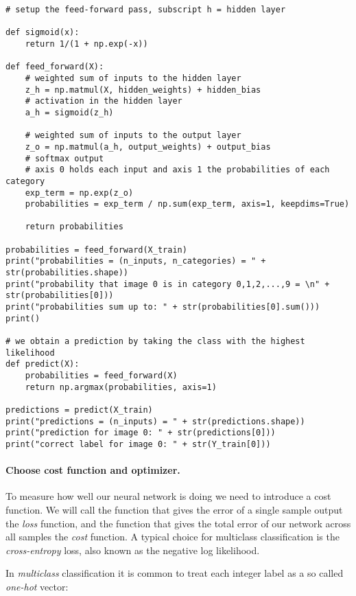 \begin{verbatim}
# setup the feed-forward pass, subscript h = hidden layer

def sigmoid(x):
    return 1/(1 + np.exp(-x))

def feed_forward(X):
    # weighted sum of inputs to the hidden layer
    z_h = np.matmul(X, hidden_weights) + hidden_bias
    # activation in the hidden layer
    a_h = sigmoid(z_h)
    
    # weighted sum of inputs to the output layer
    z_o = np.matmul(a_h, output_weights) + output_bias
    # softmax output
    # axis 0 holds each input and axis 1 the probabilities of each category
    exp_term = np.exp(z_o)
    probabilities = exp_term / np.sum(exp_term, axis=1, keepdims=True)
    
    return probabilities

probabilities = feed_forward(X_train)
print("probabilities = (n_inputs, n_categories) = " + str(probabilities.shape))
print("probability that image 0 is in category 0,1,2,...,9 = \n" + str(probabilities[0]))
print("probabilities sum up to: " + str(probabilities[0].sum()))
print()

# we obtain a prediction by taking the class with the highest likelihood
def predict(X):
    probabilities = feed_forward(X)
    return np.argmax(probabilities, axis=1)

predictions = predict(X_train)
print("predictions = (n_inputs) = " + str(predictions.shape))
print("prediction for image 0: " + str(predictions[0]))
print("correct label for image 0: " + str(Y_train[0]))

\end{verbatim}


\paragraph{Choose cost function and optimizer.}
To measure how well our neural network is doing we need to introduce a cost function.  
We will call the function that gives the error of a single sample output the \emph{loss} function, and the function
that gives the total error of our network across all samples the \emph{cost} function.
A typical choice for multiclass classification is the \emph{cross-entropy} loss, also known as the negative log likelihood.  

In \emph{multiclass} classification it is common to treat each integer label as a so called \emph{one-hot} vector:  

